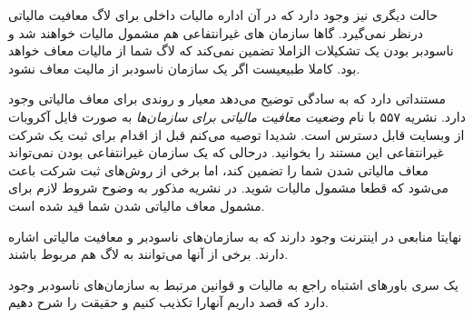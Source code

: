 حالت دیگری نیز وجود دارد که در آن اداره مالیات داخلی  برای لاگ
معافیت مالیاتی درنظر نمی‌گیرد. گاها سازمان های غیرانتفاعی هم مشمول مالیات
خواهند شد و ناسودبر بودن یک تشکیلات الزاملا تضمین نمی‌کند که لاگ شما از مالیات
معاف خواهد بود. کاملا طبیعیست اگر یک سازمان ناسودبر از مالیت معاف نشود.

مستنداتی دارد که به سادگی توضیح می‌دهد معیار و روندی برای
معاف مالیاتی وجود دارد.
نشریه ۵۵۷ با نام
{\itshape وضعیت معافیت مالیاتی برای سازمان‌ها}
به صورت فایل آکروبات از وبسایت  قابل دسترس است.
شدیدا توصیه می‌کنم قبل از اقدام برای ثبت یک شرکت غیرانتفاعی
این مستند را بخوانید.
درحالی که یک سازمان غیرانتفاعی بودن نمی‌تواند معاف مالیاتی شدن
شما را تضمین کند، اما برخی از روش‌های ثبت شرکت باعث می‌شود که
قطعا مشمول مالیات شوید. در نشریه مذکور به وضوح شروط لازم برای
مشمول معاف مالیاتی شدن شما قید شده است.


نهایتا منابعی در اینترنت وجود دارند که به سازمان‌های ناسودبر و معافیت مالیاتی
اشاره دارند. برخی از آنها می‌توانند به لاگ هم مربوط باشند.

یک سری باورهای اشتباه راجع به مالیات و قوانین مرتبط به سازمان‌های ناسودبر
وجود دارد که قصد داریم آنهارا تکذیب کنیم و حقیقت را شرح دهیم.


